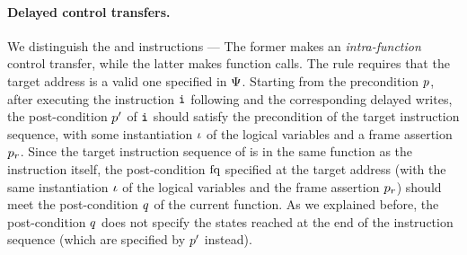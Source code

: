 %			
%			
%			
%			
%

\paragraph{\textbf{Delayed control transfers.}}
We distinguish the \jmp{} and \call{} instructions ---
The former makes an {\em intra-function} control transfer, 
while the latter makes function calls.
The  rule requires that the target
address is a valid one specified in $\Psi$.
Starting from the precondition $p$, after
executing the instruction $\texttt{i}$ following
 and the corresponding delayed writes,
the post-condition $p'$ of $\texttt{i}$ should
satisfy the precondition of the target instruction
sequence, with some instantiation $\iota$ of the
logical variables and a frame assertion $p_r$.
Since the target instruction sequence of \jmp{}
is in the same function as the \jmp{} instruction itself,
the post-condition $\text{fq}$ specified at the target address
(with the same instantiation $\iota$ of the
logical variables and the frame assertion $p_r$)
should meet the post-condition $q$ of the current
function. As we explained before, the post-condition
$q$ does not specify the states reached at
the end of the instruction sequence (which are specified
by $p'$ instead).

